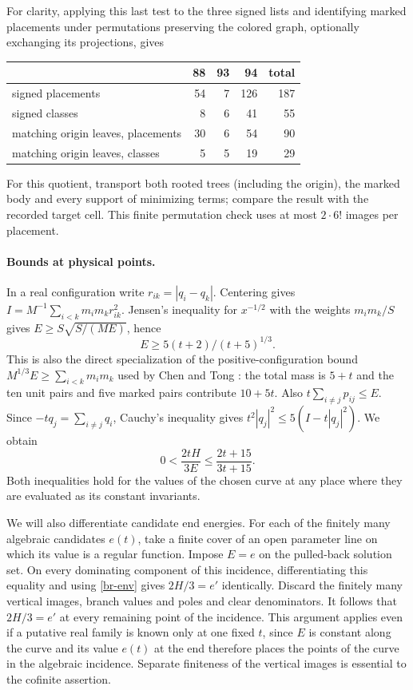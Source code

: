 \documentclass[11pt,letterpaper]{article}
\theoremstyle{definition}
\begin{document}
For clarity, applying this last test to the three signed lists and
identifying marked placements under permutations preserving the
colored graph, optionally exchanging its projections, gives
\begin{center}
\begin{tabular}{lrrrr}
\hline
 &88&93&94&total\\\hline
signed placements&54&7&126&187\\
signed classes&8&6&41&55\\
matching origin leaves, placements&30&6&54&90\\
matching origin leaves, classes&5&5&19&29\\
\hline
\end{tabular}
\end{center}
For this quotient, transport both rooted trees (including the origin),
the marked body and every support of minimizing terms; compare the
result with the recorded target cell. This finite permutation check
uses at most $2\cdot6!$ images per placement.

\paragraph{Bounds at physical points.}
In a real configuration write $r_{ik}=|q_i-q_k|$. Centering gives
$I=M^{-1}\sum_{i<k}m_im_k r_{ik}^2$. Jensen's inequality for
$x^{-1/2}$ with the weights $m_im_k/S$ gives
$E\ge S\sqrt{S/(ME)}$, hence
\begin{equation}\label{br-jensen}
 E\ge 5(t+2)/(t+5)^{1/3}.
\end{equation}
This is also the direct specialization of the positive-configuration bound $M^{1/3}E\ge\sum_{i<k}m_i m_k$ used by Chen and Tong \cite[proof of Prop.~5.21, following (112)]{CT}: the total mass is $5+t$ and the ten unit pairs and five marked pairs contribute $10+5t$.
Also $t\sum_{i\ne j}p_{ij}\le E$. Since
$-tq_j=\sum_{i\ne j}q_i$, Cauchy's inequality gives
$t^2|q_j|^2\le5(I-t|q_j|^2)$. We obtain
\begin{equation}\label{br-elastic}
 0<\frac{2tH}{3E}\le\frac{2t+15}{3t+15}.
\end{equation}
Both inequalities hold for the values of the chosen curve at any
place where they are evaluated as its constant invariants.

We will also differentiate candidate end energies. For each of the
finitely many algebraic candidates $e(t)$, take a finite cover of
an open parameter line on which its value is a regular function.
Impose $E=e$ on the pulled-back solution set. On every dominating
component of this incidence, differentiating this equality and using
\eqref{br-env} gives $2H/3=e'$ identically. Discard the finitely many
vertical images, branch values and poles and clear denominators.
It follows that $2H/3=e'$ at every remaining point of the incidence.
This argument applies even if a putative real family is known only
at one fixed $t$, since $E$ is constant along the curve and its value $e(t)$ at the end therefore places the points of the curve
in the algebraic incidence. Separate finiteness of the vertical images
is essential to the cofinite assertion.
\end{document}
